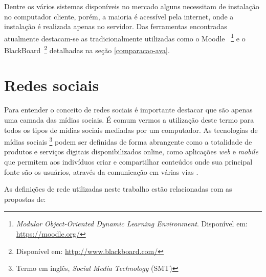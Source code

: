 Dentre os vários sistemas disponíveis no mercado alguns necessitam de instalação no computador cliente, porém, a maioria é acessível pela internet, onde a instalação é realizada apenas no servidor. Das ferramentas encontradas atualmente destacam-se as tradicionalmente utilizadas como o Moodle ~\footnote{\textit{Modular Object-Oriented Dynamic Learning Environment}. Disponível em: \url{https://moodle.org/}} e o BlackBoard~\footnote{Disponível em: \url{http://www.blackboard.com/}} detalhadas na seção \ref{comparacao-ava}.
%
%
%
\section{Redes sociais}
\label{rede-social}

Para entender o conceito de redes sociais é importante destacar que são apenas uma camada das mídias sociais. É comum vermos a utilização deste termo para todos os tipos de mídias sociais mediadas por um computador. As tecnologias de mídias sociais \footnote{Termo em inglês, \textit{Social Media Technology} (SMT)} podem ser definidas de forma abrangente como a totalidade de produtos e serviços digitais disponibilizados online, como aplicações \textit{web} e \textit{mobile} que permitem aos indivíduos criar e compartilhar conteúdos onde sua principal fonte são os usuários, através da comunicação em várias vias \cite{davis2012social}.

As definições de rede utilizadas neste trabalho estão relacionadas com as propostas de:

